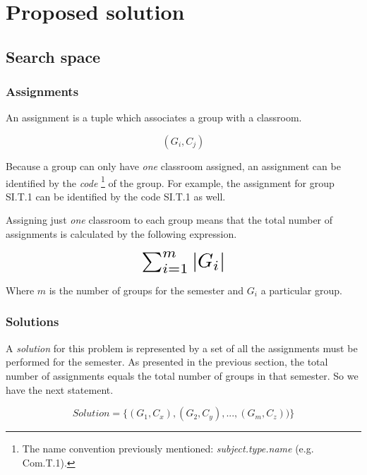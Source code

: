 \renewcommand{\documentname}{Proposed solution}

\chapter{Proposed solution}


\section{Search space}


\subsection{Assignments}

An assignment is a tuple which associates a group with a classroom.

\begin{equation}
    (G_{i}, C_{j})
\end{equation}

Because a group can only have \textit{one} classroom assigned, an assignment can be identified by the \textit{code} \footnote{The name convention previously mentioned: \textit{subject.type.name} (e.g. Com.T.1).} of the group. For example, the assignment for group SI.T.1 can be identified by the code SI.T.1 as well.

Assigning just \textit{one} classroom to each group means that the total number of assignments is calculated by the following expression.

\begin{equation}
    \scalebox{2}{$\sum_{i=1}^m \left|G_{i}\right|$}
\end{equation}

Where $m$ is the number of groups for the semester and $G_{i}$ a particular group.

\subsection{Solutions}

A \textit{solution} for this problem is represented by a set of all the assignments must be performed for the semester. As presented in the previous section, the total number of assignments equals the total number of groups in that semester. So we have the next statement.

\begin{equation}
    Solution = \{ (G_{1}, C_{x}), (G_{2}, C_{y}), ..., (G_{m}, C_{z})) \}
\end{equation}

